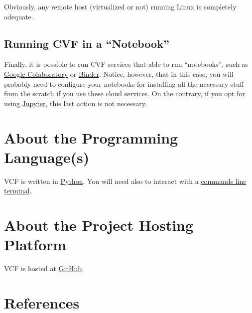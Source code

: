 Obviously, any remote host (virtualized or not) running Linux is
completely adequate.

\subsection{Running CVF in a ``Notebook''}
Finally, it is possible to run CVF services that able to run
``notebooks'', such as
\href{https://colab.research.google.com/}{Google Colaboratory} or
\href{https://mybinder.org/}{Binder}. Notice, however, that in this
case, you will probably need to configure your notebooks for
installing all the necessary stuff from the scratch if you use these
cloud services. On the contrary, if you opt for using
\href{https://jupyter.org/}{Jupyter}, this last action is not
necessary.

\section{About the Programming Language(s)}

VCF is written in \href{https://www.python.org/}{Python}. You will need
also to interact with
a \href{https://en.wikipedia.org/wiki/Command-line_interface}{commands
line terminal}.

\section{About the Project Hosting Platform}

VCF is hosted at \href{https://github.com}{GitHub}.

\section{References}

\renewcommand{\addcontentsline}[3]{}%


